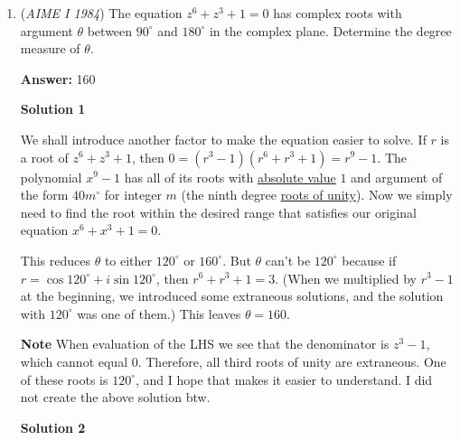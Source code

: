 \begin{enumerate}
Or [python]def f(n):

 \begin{verbatim}
if n < 1000:       return f(f(n + 5))  else:      return n-3
\end{verbatim}

print(f(84))[/python]

 Note:"Do THIS ON A REAL TEST" does not mean open up python on the real AIME(hopefully)

 


	\item (\textit{AIME I 1984}) The equation $z^6+z^3+1=0$ has complex roots with argument $\theta$ between $90^\circ$ and $180^\circ$ in the complex plane. Determine the degree measure of $\theta$.


 
 \textbf{Answer: }160



\textbf{Solution 1}

We shall introduce another factor to make the equation easier to solve. If $r$ is a root of $z^6+z^3+1$, then $0=(r^3-1)(r^6+r^3+1)=r^9-1$. The polynomial $x^9-1$ has all of its roots with \href{https://artofproblemsolving.com/wiki/index.php?title=Absolute\_value}{absolute value} $1$ and argument of the form $40m^\circ$ for integer $m$ (the ninth degree \href{https://artofproblemsolving.com/wiki/index.php?title=Roots\_of\_unity}{roots of unity}). Now we simply need to find the root within the desired range that satisfies our original equation $x^6 + x^3 + 1 = 0$.

 This reduces $\theta$ to either $120^{\circ}$ or $160^{\circ}$. But $\theta$ can't be $120^{\circ}$ because if $r=\cos 120^\circ +i\sin 120^\circ$, then $r^6+r^3+1=3$. (When we multiplied by $r^3 - 1$ at the beginning, we introduced some extraneous solutions, and the solution with $120^\circ$ was one of them.) This leaves $\boxed{\theta=160}$.

 \textbf{Note} When evaluation of the LHS we see that the denominator is $z^3 - 1$, which cannot equal 0. Therefore, all third roots of unity are extraneous. One of these roots is $120^\circ$, and I hope that makes it easier to understand. I did not create the above solution btw.

 



\textbf{Solution 2}


\end{enumerate}
